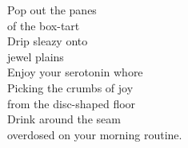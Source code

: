 Pop out the panes\\
of the box-tart\\
Drip sleazy onto\\
jewel plains\\
Enjoy your serotonin whore\\
Picking the crumbs of joy\\
from the disc-shaped floor\\
Drink around the seam\\
overdosed on your morning routine.\\
